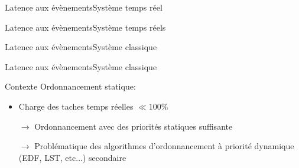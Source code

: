 \begin{frame}{Latence aux évènements}{Système temps réel}
  \begin{center}
  \end{center}
\end{frame}

\begin{frame}{Latence aux évènements}{Système temps réels}
  \begin{center}
  \end{center}
\end{frame}

\begin{frame}{Latence aux évènements}{Système classique}
  \begin{center}
  \end{center}
\end{frame}

\begin{frame}{Latence aux évènements}{Système classique}
  \begin{center}
  \end{center}
\end{frame}


\begin{frame}{Contexte}
  Ordonnancement statique:
  \begin{itemize}
    \item Charge des taches temps réelles $\ll 100\%$
    \item[$\to$]   Ordonnancement   avec   des   priorités   statiques
      suffisante
    \item[$\to$]  Problématique  des  algorithmes  d'ordonnancement  à
      priorité dynamique (EDF, LST, etc...) secondaire
  \end{itemize}
\end{frame}

